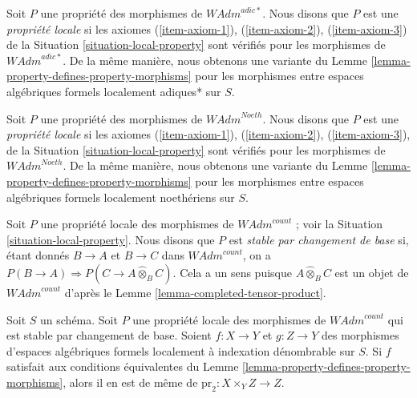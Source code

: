 \begin{remark}
\label{remark-variant-adic-star}
Soit $P$ une propriété des morphismes de $\textit{WAdm}^{adic*}$.
Nous disons que $P$ est une {\it propriété locale} si les axiomes
(\ref{item-axiom-1}), (\ref{item-axiom-2}), (\ref{item-axiom-3})
de la Situation \ref{situation-local-property}
sont vérifiés pour les morphismes de $\textit{WAdm}^{adic*}$. De la même manière,
nous obtenons une variante du Lemme \ref{lemma-property-defines-property-morphisms}
pour les morphismes entre espaces algébriques formels localement adiques* sur $S$.
\end{remark}

\begin{remark}
\label{remark-variant-Noetherian}
Soit $P$ une propriété des morphismes de $\textit{WAdm}^{Noeth}$.
Nous disons que $P$ est une {\it propriété locale} si les axiomes
(\ref{item-axiom-1}), (\ref{item-axiom-2}), (\ref{item-axiom-3}),
de la Situation \ref{situation-local-property}
sont vérifiés pour les morphismes de $\textit{WAdm}^{Noeth}$. De la même manière,
nous obtenons une variante du Lemme \ref{lemma-property-defines-property-morphisms}
pour les morphismes entre espaces algébriques formels localement noethériens sur $S$.
\end{remark}

\begin{situation}
\label{situation-base-change-local-property}
Soit $P$ une propriété locale des morphismes de $\textit{WAdm}^{count}$ ; voir la
Situation \ref{situation-local-property}. Nous disons que $P$ est {\it stable par
changement de base} si, étant donnés $B \to A$ et $B \to C$ dans $\textit{WAdm}^{count}$,
on a $P(B \to A) \Rightarrow P(C \to A \widehat{\otimes}_B C)$.
Cela a un sens puisque $A \widehat{\otimes}_B C$ est un objet de
$\textit{WAdm}^{count}$ d'après le Lemme \ref{lemma-completed-tensor-product}.
\end{situation}

\begin{lemma}
\label{lemma-base-change-property-morphisms}
Soit $S$ un schéma. Soit $P$ une propriété locale des morphismes de
$\textit{WAdm}^{count}$ qui est stable par changement de base.
Soient $f : X \to Y$ et $g : Z \to Y$ des morphismes d'espaces algébriques formels
localement à indexation dénombrable sur $S$. Si $f$ satisfait aux conditions équivalentes du
Lemme \ref{lemma-property-defines-property-morphisms},
alors il en est de même de $\text{pr}_2 : X \times_Y Z \to Z$.
\end{lemma}

